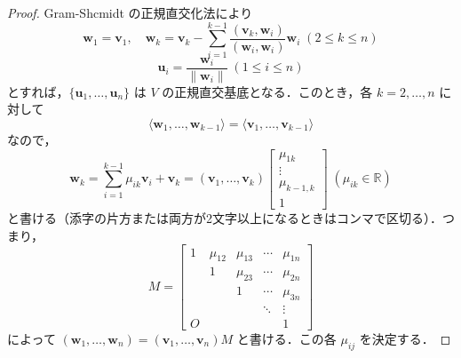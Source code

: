 \documentclass[11pt, uplatex, dvipdfmx]{jsarticle}
\theoremstyle{definition}
\begin{document}
\begin{proof}
  Gram-Shcmidt の正規直交化法により
  \[
    \bm{w}_1 = \bm{v}_1, \quad \bm{w}_k = \bm{v}_k - \sum_{i=1}^{k-1}
    \frac{(\bm{v}_k, \bm{w}_{i})}{(\bm{w}_i,\bm{w}_i)}\bm{w}_i \; (2 \leq k \leq n)
  \]
  \[
    \bm{u}_i = \frac{\bm{w}_i}{\|\bm{w}_i\|} \; (1 \leq i \leq n)
  \]
  とすれば，$\{\bm{u}_1, \ldots, \bm{u}_n\}$ は $V$ の正規直交基底となる．このとき，各 $k=2,\ldots, n$ に対して
  \[
    \langle \bm{w}_1, \ldots, \bm{w}_{k-1}\rangle =\langle \bm{v}_1,
    \ldots, \bm{v}_{k-1}\rangle
  \]
  なので，
  \[
    \bm{w}_k = \sum_{i=1}^{k-1}\mu_{i k} \bm{v}_i + \bm{v}_k = \left(\bm{v}_1, \ldots, \bm{v}_{k}\right) \left[
      \begin{array}{c}
        \mu_{1k}\\
        \vdots\\
        \mu_{k-1,k}\\
        1
      \end{array}
    \right]\; (\mu_{ik} \in \mathbb{R})
  \]
  と書ける（添字の片方または両方が2文字以上になるときはコンマで区切る）．つ
  まり，
  \[
    M = \left[
      \begin{array}{ccccc}
        1 & \mu_{12} & \mu_{13} & \cdots & \mu_{1n}\\
          & 1 & \mu_{23} & \cdots & \mu_{2n}\\
          &  & 1 & \cdots & \mu_{3n}\\
          &  &  & \ddots & \vdots\\
        O &  &  &  & 1
      \end{array}
    \right]
  \]
  によって $(\bm{w}_1, \ldots, \bm{w}_n) = (\bm{v}_1, \ldots,
  \bm{v}_n) M$ と書ける．この各 $\mu_{ij}$ を決定する．
  

\end{proof}
\end{document}
